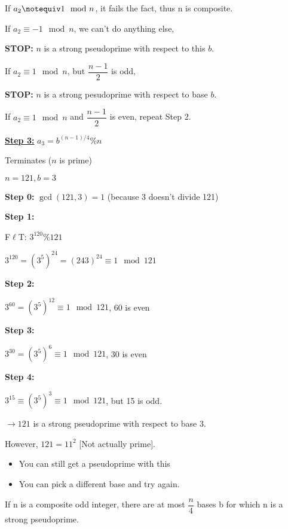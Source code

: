 \begin{definition}
If $a_{2} \notequiv 1 \mod n$, it fails the fact, thus n is composite.

If $a_{2} \equiv -1 \mod n$, we can't do anything else,
    
    \quad \textbf{STOP:} $n$ is a strong pseudoprime with respect to this $b$.

If $a_{2} \equiv 1 \mod n$, but $\dfrac{n-1}{2}$ is odd,
    
    \quad \textbf{STOP:} $n$ is a strong pesudoprime with respect to base $b$.
    
If $a_{2} \equiv 1 \mod n$ and $\dfrac{n-1}{2}$ is even, repeat Step 2.

\noindent \textbf{\underline{Step 3:}} $a_{3} = b^{(n-1)/4} \% n$

Terminates ($n$ is prime)


\begin{example}
$n = 121, b = 3$

\textbf{Step 0: } $\gcd(121, 3) = 1$ (because 3 doesn't divide 121)


\textbf{Step 1: }

\quad F$\ell$T: $3^{120} \% 121$

\quad $ 3^{120} = (3^{5})^{24} = (243)^{24} \equiv 1 \mod 121$

\textbf{Step 2: }

\quad $3^{60} = (3^{5})^{12} \equiv 1 \mod 121$, 60 is even

\textbf{Step 3: }

\quad $3^{30} = (3^{5})^{6} \equiv 1 \mod 121$, 30 is even

\textbf{Step 4: }

\quad $3^{15} \equiv (3^{5})^{3} \equiv 1 \mod 121$, but 15 is odd.

$\longrightarrow 121$ is a strong pseudoprime with respect to base 3.

However, $121 = 11^{2}$ [Not actually prime].
\end{example}

\begin{itemize}
\item You can still get a pseudoprime with this
\item You can pick a different base and try again.
\end{itemize}

\noindent \begin{theorem}
If n is a composite odd integer, there are at most $\dfrac{n}{4}$ bases b for which n is a strong pseudoprime.
\end{theorem}


\end{definition}
